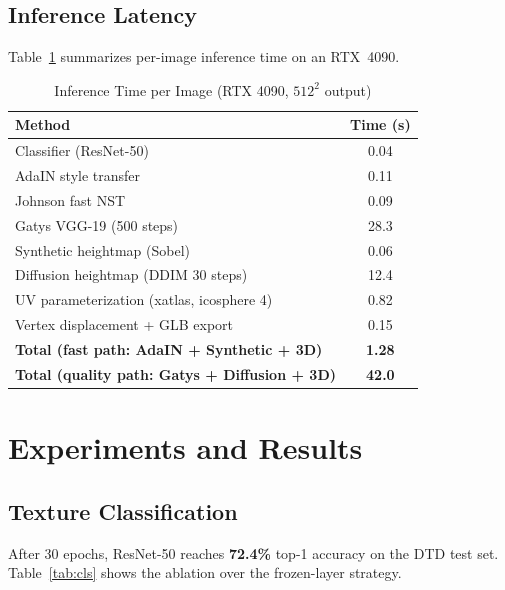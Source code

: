 \documentclass[conference]{IEEEtran}
\begin{document}
\subsection{Inference Latency}

Table~\ref{tab:timing} summarizes per-image inference time on an RTX~4090.

\begin{table}[htbp]
\caption{Inference Time per Image (RTX 4090, $512^2$ output)}
\begin{center}
\begin{tabular}{lc}
\toprule
\textbf{Method}                       & \textbf{Time (s)} \\
\midrule
Classifier (ResNet-50)                &  0.04 \\
AdaIN style transfer                  &  0.11 \\
Johnson fast NST                      &  0.09 \\
Gatys VGG-19 (500 steps)              & 28.3  \\
Synthetic heightmap (Sobel)           &  0.06 \\
Diffusion heightmap (DDIM 30 steps)   & 12.4  \\
UV parameterization (xatlas, icosphere 4) & 0.82 \\
Vertex displacement + GLB export      &  0.15 \\
\midrule
\textbf{Total (fast path: AdaIN + Synthetic + 3D)} & \textbf{1.28} \\
\textbf{Total (quality path: Gatys + Diffusion + 3D)} & \textbf{42.0} \\
\bottomrule
\end{tabular}
\label{tab:timing}
\end{center}
\end{table}

\section{Experiments and Results}

\subsection{Texture Classification}

After 30 epochs, ResNet-50 reaches \textbf{72.4\%} top-1 accuracy on the
DTD test set. Table~\ref{tab:cls} shows the ablation over the frozen-layer
strategy.
\end{document}

